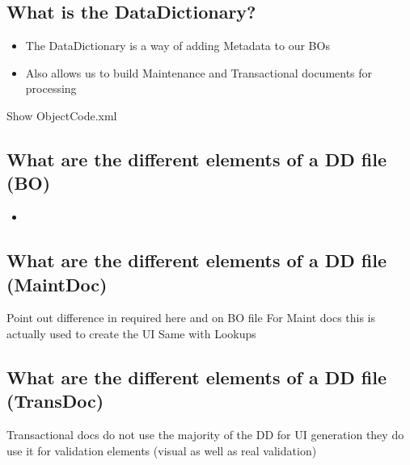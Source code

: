 \begin{ifhtml}
    \begin{s5slide}
        \section{What is the DataDictionary?}
            \begin{itemize}
                \item The DataDictionary is a way of adding Metadata to our BOs
                \item Also allows us to build Maintenance and Transactional documents for processing
            \end{itemize}
            \begin{s5notes}
                Show ObjectCode.xml
            \end{s5notes}
    \end{s5slide}
    \begin{s5slide}
        \section{What are the different elements of a DD file (BO)}
            \begin{itemize}
                \item 
            \end{itemize}
    \end{s5slide}
    \begin{s5slide}
        \section{What are the different elements of a DD file (MaintDoc)}
            
            \begin{s5notes}
                Point out difference in required here and on BO file
                For Maint docs this is actually used to create the UI
                Same with Lookups
            \end{s5notes}
            
    \end{s5slide}
    \begin{s5slide}
        \section{What are the different elements of a DD file (TransDoc)}
            \begin{s5notes}
                Transactional docs do not use the majority of the DD for UI generation they do use it for validation elements (visual as well as real validation)
            \end{s5notes}
    \end{s5slide}
    \begin{s5slide}

\end{s5slide}
\end{ifhtml}
